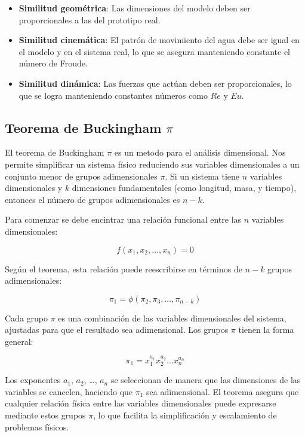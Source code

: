 \begin{itemize}
    \item \textbf{Similitud geométrica}: Las dimensiones del modelo deben ser proporcionales a las del prototipo real.
    \item \textbf{Similitud cinemática}: El patrón de movimiento del agua debe ser igual en el modelo y en el sistema real, lo que se asegura manteniendo constante el número de Froude.
    \item \textbf{Similitud dinámica}: Las fuerzas que actúan deben ser proporcionales, lo que se logra manteniendo constantes números como $Re$ y $Eu$.
\end{itemize}

\subsection{Teorema de Buckingham $\pi$}

El teorema de Buckingham $\pi$ es un metodo para el análisis dimensional. Nos permite simplificar un sistema físico reduciendo sus variables dimensionales a un conjunto menor de grupos adimensionales $\pi$. Si un sistema tiene $n$ variables dimensionales y $k$ dimensiones fundamentales (como longitud, masa, y tiempo), entonces el número de grupos adimensionales es $n - k$.

Para comenzar se debe encintrar una relación funcional entre las $n$ variables dimensionales:

\begin{equation}
f(x_1, x_2, \ldots, x_n) = 0
\end{equation}

Según el teorema, esta relación puede reescribirse en términos de $n - k$ grupos adimensionales:

\begin{equation}
\pi_1 = \phi(\pi_2, \pi_3, \ldots, \pi_{n-k})
\end{equation}

Cada grupo $\pi$ es una combinación de las variables dimensionales del sistema, ajustadas para que el resultado sea adimensional. Los grupos $\pi$ tienen la forma general:

\begin{equation}
\pi_1 = x_1^{a_1} x_2^{a_2} \ldots x_n^{a_n}
\end{equation}

Los exponentes $a_1$, $a_2$, \ldots, $a_n$ se seleccionan de manera que las dimensiones de las variables se cancelen, haciendo que $\pi_1$ sea adimensional. El teorema asegura que cualquier relación física entre las variables dimensionales puede expresarse mediante estos grupos $\pi$, lo que facilita la simplificación y escalamiento de problemas físicos.

